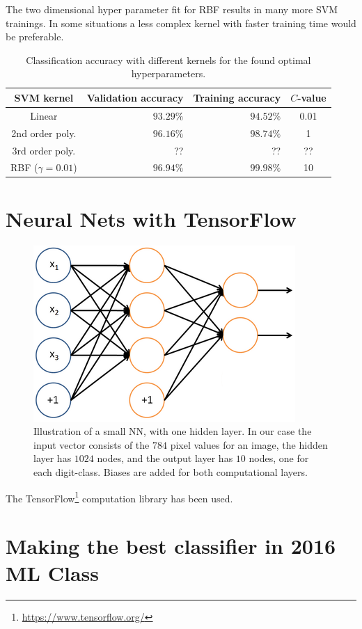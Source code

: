 \documentclass[a4paper,10pt,article,oneside,english]{memoir}
\begin{document}
The two dimensional hyper parameter fit for RBF results in many more SVM trainings. In some situations a less complex kernel with faster training time would be preferable.

\begin{table}[h!]
	\centering
	\caption{Classification accuracy with different kernels for the found optimal hyperparameters. }
	\label{tab:svm_accuracy}
	\begin{tabular}{crr S[table-format=2.4]}
		SVM kernel & Validation accuracy & Training accuracy & {$C$-value} \\ 
		\hline 
		Linear & $93.29\%$ & $94.52\%$ & 0.01 \\ 
		2nd order poly. & $96.16\%$ & $98.74\%$ & 1 \\ 
		3rd order poly. & {??} & {??} & {??} \\ 
		RBF ($\gamma=0.01$) & $96.94\%$ & $99.98\%$ & 10 \\ 
	\end{tabular} 
\end{table}










\chapter{Neural Nets with TensorFlow}

\begin{figure}[h!]
	\centering
	\includegraphics[width=0.4\linewidth]{nn_layout.png}
	\caption{Illustration of a small NN, with one hidden layer. In our case the input vector consists of the $784$ pixel values for an image, the hidden layer has $1024$ nodes, and the output layer has $10$ nodes, one for each digit-class. Biases are added for both computational layers.}
	\label{fig:nn_layout}
\end{figure}
The TensorFlow\footnote{\url{https://www.tensorflow.org/}} computation library has been used.

\chapter{Making the best classifier in 2016 ML Class}



	
\end{document}
